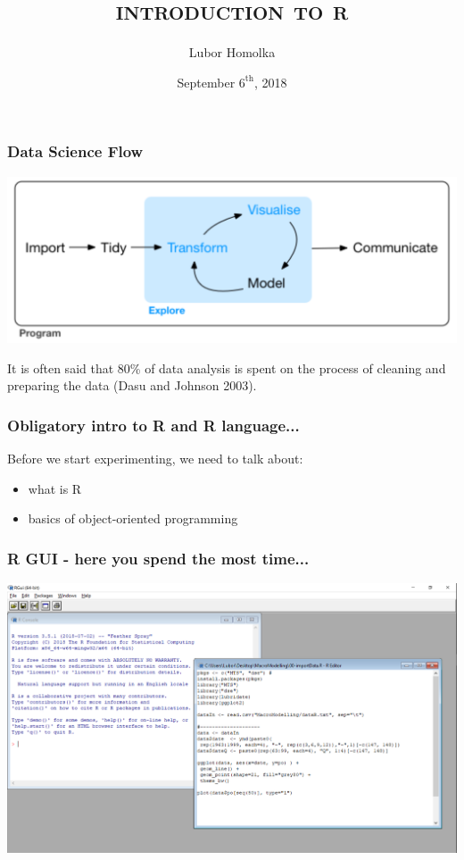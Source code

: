 \documentclass[12pt]{beamer}\usepackage[]{graphicx}\usepackage[]{color}
\begin{document}
\title{\textsc{introduction to r} }
\subtitle{Lubor Homolka}
\date{September $6^{\text{th}}$, 2018}
\begin{frame}
\titlepage
\end{frame}


\begin{frame}
\frametitle{Data Science Flow}
\includegraphics[width=\textwidth,height=\textheight,keepaspectratio]{./Images/01_dataScience}

\end{frame}


\begin{frame}\large
It is often said that 80\% of data analysis is spent on the process of cleaning and preparing
the data (Dasu and Johnson 2003).

\end{frame}

\begin{frame}\Large
\frametitle{Obligatory intro to R and R language...}

Before we start experimenting, we need to talk about:
\begin{itemize}
 \item what is R
 \item basics of object-oriented programming
\end{itemize}

\end{frame}

\begin{frame}
\frametitle{R GUI - here you spend the most time...}
\includegraphics[width=\textwidth,height=\textheight,keepaspectratio]{./Images/02_GUI}
\end{frame}
\end{document}
